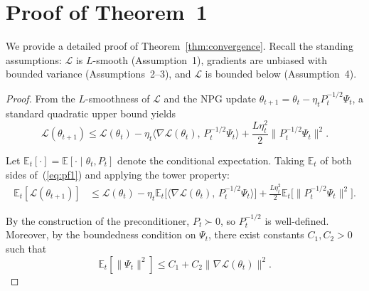\documentclass[11pt,twoside,openright]{book}
\begin{document}

\appendix
\chapter{Proof of Theorem~1}\label{app:proofs}

We provide a detailed proof of Theorem~\ref{thm:convergence}. Recall the standing assumptions:
$\mathcal{L}$ is $L$-smooth (Assumption~1), gradients are unbiased with bounded variance
(Assumptions~2--3), and $\mathcal{L}$ is bounded below (Assumption~4).

\begin{proof}
From the $L$-smoothness of $\mathcal{L}$ and the NPG update $\theta_{t+1} = \theta_t -
\eta_t P_t^{-1/2}\Psi_t$, a standard quadratic upper bound yields
\begin{equation}
  \mathcal{L}(\theta_{t+1}) \leq \mathcal{L}(\theta_t)
    - \eta_t \langle\nabla\mathcal{L}(\theta_t),\, P_t^{-1/2}\Psi_t\rangle
    + \frac{L\eta_t^2}{2}\|P_t^{-1/2}\Psi_t\|^2.
  \label{eq:pf1}
\end{equation}

Let $\mathbb{E}_t[\cdot] = \mathbb{E}[\cdot \mid \theta_t, P_t]$ denote the conditional
expectation. Taking $\mathbb{E}_t$ of both sides of~(\ref{eq:pf1}) and applying the tower
property:
\begin{align}
  \mathbb{E}_t[\mathcal{L}(\theta_{t+1})]
    &\leq \mathcal{L}(\theta_t)
      - \eta_t \mathbb{E}_t\bigl[\langle\nabla\mathcal{L}(\theta_t),\,
        P_t^{-1/2}\Psi_t\rangle\bigr]
      + \frac{L\eta_t^2}{2}\mathbb{E}_t\bigl[\|P_t^{-1/2}\Psi_t\|^2\bigr].
  \label{eq:pf2}
\end{align}

By the construction of the preconditioner, $P_t \succ 0$, so $P_t^{-1/2}$ is well-defined.
Moreover, by the boundedness condition on $\Psi_t$, there exist constants $C_1, C_2 > 0$ such
that
\begin{equation}
  \mathbb{E}_t[\|\Psi_t\|^2] \leq C_1 + C_2\|\nabla\mathcal{L}(\theta_t)\|^2.
  \label{eq:pf3}
\end{equation}


\end{proof}
\end{document}
